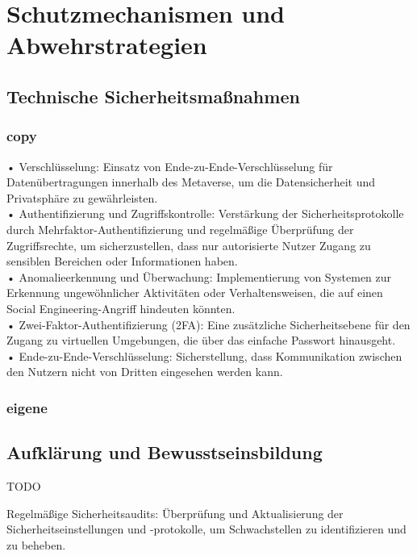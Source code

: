 \chapter{Schutzmechanismen und Abwehrstrategien}\label{ch:SchutzmechanismenundAbwehrstrategien}

\section{Technische Sicherheitsmaßnahmen}
\subsection*{copy}
• Verschlüsselung: Einsatz von Ende-zu-Ende-Verschlüsselung für Datenübertragungen innerhalb des Metaverse, um die Datensicherheit und Privatsphäre zu gewährleisten.\\
• Authentifizierung und Zugriffskontrolle: Verstärkung der Sicherheitsprotokolle durch Mehrfaktor-Authentifizierung und regelmäßige Überprüfung der Zugriffsrechte, um sicherzustellen, dass nur autorisierte Nutzer Zugang zu sensiblen Bereichen oder Informationen haben.\\
• Anomalieerkennung und Überwachung: Implementierung von Systemen zur Erkennung ungewöhnlicher Aktivitäten oder Verhaltensweisen, die auf einen Social Engineering-Angriff hindeuten könnten.\\

• Zwei-Faktor-Authentifizierung (2FA): Eine zusätzliche Sicherheitsebene für den Zugang zu virtuellen Umgebungen, die über das einfache Passwort hinausgeht.\\
• Ende-zu-Ende-Verschlüsselung: Sicherstellung, dass Kommunikation zwischen den Nutzern nicht von Dritten eingesehen werden kann.\\


\subsection*{eigene}


\section{Aufklärung und Bewusstseinsbildung}
TODO

Regelmäßige Sicherheitsaudits: Überprüfung und Aktualisierung der Sicherheitseinstellungen und -protokolle, um Schwachstellen zu identifizieren und zu beheben.\\